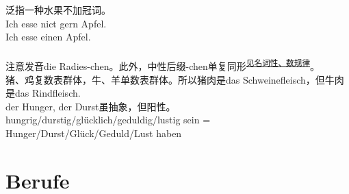\noindent
泛指一种水果不加冠词。 \\
Ich esse nict gern Apfel. \\
Ich esse einen Apfel. \\
\\
注意发音die Radies-chen。此外，中性后缀-chen单复同形\textsuperscript{\hyperref[sec:noun:gender:number]{见名词性、数规律}}。
\\
猪、鸡复数表群体，牛、羊单数表群体。所以猪肉是das Schweinefleisch，但牛肉是das Rindfleisch.
\\
der Hunger, der Durst虽抽象，但阳性。\\
hungrig/durstig/glücklich/geduldig/lustig sein = Hunger/Durst/Glück/Geduld/Lust haben \\

\section{Berufe}
